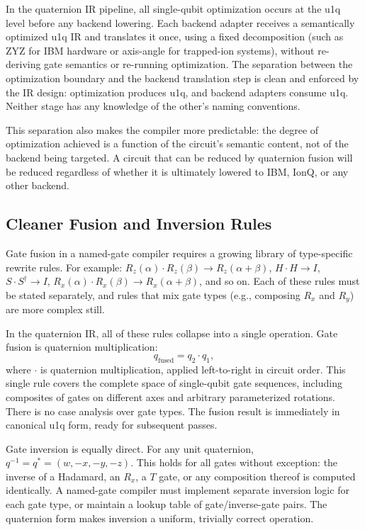 \documentclass[conference]{IEEEtran}
\begin{document}
In the quaternion IR pipeline, all single-qubit optimization occurs at the u1q level
before any backend lowering. Each backend adapter receives a semantically optimized u1q
IR and translates it once, using a fixed decomposition (such as ZYZ for IBM hardware or
axis-angle for trapped-ion systems), without re-deriving gate semantics or re-running
optimization. The separation between the optimization boundary and the backend translation
step is clean and enforced by the IR design: optimization produces u1q, and backend
adapters consume u1q. Neither stage has any knowledge of the other's naming conventions.

This separation also makes the compiler more predictable: the degree of optimization
achieved is a function of the circuit's semantic content, not of the backend being
targeted. A circuit that can be reduced by quaternion fusion will be reduced regardless
of whether it is ultimately lowered to IBM, IonQ, or any other backend.

\subsection{Cleaner Fusion and Inversion Rules}

Gate fusion in a named-gate compiler requires a growing library of type-specific rewrite
rules. For example: $R_z(\alpha) \cdot R_z(\beta) \to R_z(\alpha{+}\beta)$,
$H \cdot H \to I$, $S \cdot S^\dagger \to I$, $R_x(\alpha) \cdot R_x(\beta) \to R_x(\alpha{+}\beta)$,
and so on. Each of these rules must be stated separately, and rules that mix gate types
(e.g., composing $R_x$ and $R_y$) are more complex still.

In the quaternion IR, all of these rules collapse into a single operation. Gate fusion
is quaternion multiplication:
\begin{equation}
q_{\text{fused}} = q_2 \cdot q_1,
\label{eq:fusion}
\end{equation}
where $\cdot$ is quaternion multiplication, applied left-to-right in circuit order.
This single rule covers the complete space of single-qubit gate sequences, including
composites of gates on different axes and arbitrary parameterized rotations. There is no
case analysis over gate types. The fusion result is immediately in canonical u1q form,
ready for subsequent passes.

Gate inversion is equally direct. For any unit quaternion, $q^{-1} = q^* = (w, -x, -y, -z)$.
This holds for all gates without exception: the inverse of a Hadamard, an $R_x$, a $T$
gate, or any composition thereof is computed identically. A named-gate compiler must
implement separate inversion logic for each gate type, or maintain a lookup table of
gate/inverse-gate pairs. The quaternion form makes inversion a uniform, trivially correct
operation.
\end{document}
